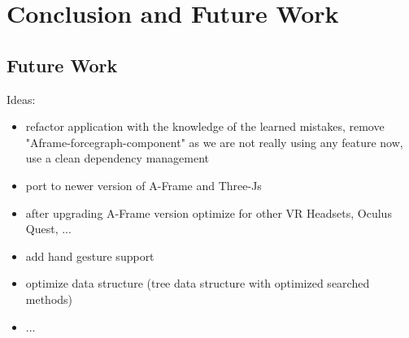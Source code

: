 \chapter{Conclusion and Future Work}

\section{Future Work}
Ideas:
\begin{itemize}
    \item refactor application with the knowledge of the learned mistakes, remove "Aframe-forcegraph-component" as we are not really using any feature now, use a clean dependency management
    \item port to newer version of A-Frame and Three-Js
    \item after upgrading A-Frame version optimize for other VR Headsets, Oculus Quest, ... 
    \item add hand gesture support
    \item optimize data structure (tree data structure  with optimized searched methods)
    \item ...
\end{itemize}